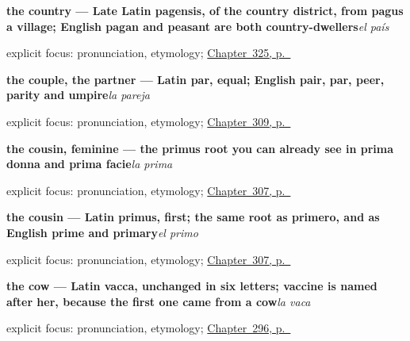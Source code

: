 \noindent\begin{minipage}[t]{\linewidth}
\raggedright
\textbf{the country — Late Latin pagensis, of the country district, from pagus a village; English pagan and peasant are both country-dwellers}\enspace\emph{el país}\par
\footnotesize explicit focus: pronunciation, etymology; \hyperref[ch:pais-y-lugar]{Chapter~325, p.~\pageref*{ch:pais-y-lugar}}
\end{minipage}\par\smallskip

\noindent\begin{minipage}[t]{\linewidth}
\raggedright
\textbf{the couple, the partner --- Latin par, equal; English pair, par, peer, parity and umpire}\enspace\emph{la pareja}\par
\footnotesize explicit focus: pronunciation, etymology; \hyperref[ch:familia-y-pareja]{Chapter~309, p.~\pageref*{ch:familia-y-pareja}}
\end{minipage}\par\smallskip

\noindent\begin{minipage}[t]{\linewidth}
\raggedright
\textbf{the cousin, feminine --- the primus root you can already see in prima donna and prima facie}\enspace\emph{la prima}\par
\footnotesize explicit focus: pronunciation, etymology; \hyperref[ch:esposos-y-tios]{Chapter~307, p.~\pageref*{ch:esposos-y-tios}}
\end{minipage}\par\smallskip

\noindent\begin{minipage}[t]{\linewidth}
\raggedright
\textbf{the cousin --- Latin primus, first; the same root as primero, and as English prime and primary}\enspace\emph{el primo}\par
\footnotesize explicit focus: pronunciation, etymology; \hyperref[ch:esposos-y-tios]{Chapter~307, p.~\pageref*{ch:esposos-y-tios}}
\end{minipage}\par\smallskip

\noindent\begin{minipage}[t]{\linewidth}
\raggedright
\textbf{the cow — Latin vacca, unchanged in six letters; vaccine is named after her, because the first one came from a cow}\enspace\emph{la vaca}\par
\footnotesize explicit focus: pronunciation, etymology; \hyperref[ch:animales]{Chapter~296, p.~\pageref*{ch:animales}}
\end{minipage}\par\smallskip


